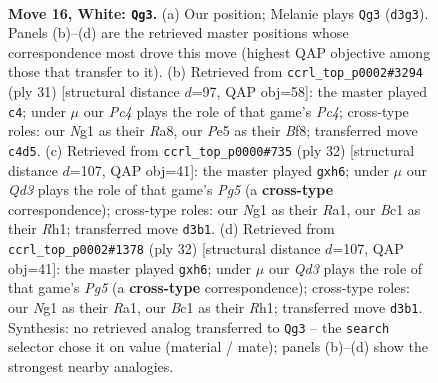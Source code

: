 \documentclass[11pt]{article}
\begin{document}
\begin{figure}[p]\centering
\begin{subfigure}{0.46\textwidth}\centering
\resizebox{\linewidth}{!}{%
\newchessgame
\chessboard[
  setfen={r3k1nr/1pq5/4p3/p1bpPp1p/b1Pn2p1/P2Q4/RP1N1PPP/2B1KBNR w Kkq - 5 16},
  showmover=false,
  pgfstyle=straightmove, color=movearrow, markmove={d3-g3}
]}
\caption{}
\end{subfigure}\hfill
\begin{subfigure}{0.46\textwidth}\centering
\resizebox{\linewidth}{!}{%
\newchessgame
\chessboard[
  setfen={r3kbnr/1p1n1bpp/p1q1P3/1Npp1p2/5B2/1QP2N1P/PP4P1/R3KB1R b KQkq - 0 16},
  showmover=false,
  pgfstyle=straightmove, color=movearrow, markmove={c5-c4}
]}
\caption{}
\end{subfigure}
\\[4pt]
\begin{subfigure}{0.46\textwidth}\centering
\resizebox{\linewidth}{!}{%
\newchessgame
\chessboard[
  setfen={r3k2r/1bq2p1p/3p1npb/p1n1p1P1/1pP1P3/4BP2/PP1QBN1P/R3K2R w KQkq - 0 17},
  showmover=false,
  pgfstyle=straightmove, color=movearrow, markmove={g5-h6}
]}
\caption{}
\end{subfigure}\hfill
\begin{subfigure}{0.46\textwidth}\centering
\resizebox{\linewidth}{!}{%
\newchessgame
\chessboard[
  setfen={r3k2r/1bq2p1p/3p1npb/p1n1p1P1/1pP1P3/4BP2/PP1QBN1P/R3K2R w KQkq - 0 17},
  showmover=false,
  pgfstyle=straightmove, color=movearrow, markmove={g5-h6}
]}
\caption{}
\end{subfigure}
\caption{\textbf{Move 16, White: \texttt{Qg3}.} (a) Our position; Melanie plays \texttt{Qg3} (\texttt{d3g3}). Panels (b)--(d) are the retrieved master positions whose correspondence most drove this move (highest QAP objective among those that transfer to it). (b) Retrieved from \texttt{ccrl\_top\_p0002\#3294} (ply 31) [structural distance $d$=97, QAP obj=58]: the master played \texttt{c4}; under $\mu$ our \emph{Pc4} plays the role of that game's \emph{Pc4}; cross-type roles: our \emph{N}g1 as their \emph{R}a8, our \emph{P}e5 as their \emph{B}f8; transferred move \texttt{c4d5}. (c) Retrieved from \texttt{ccrl\_top\_p0000\#735} (ply 32) [structural distance $d$=107, QAP obj=41]: the master played \texttt{gxh6}; under $\mu$ our \emph{Qd3} plays the role of that game's \emph{Pg5} (a \textbf{cross-type} correspondence); cross-type roles: our \emph{N}g1 as their \emph{R}a1, our \emph{B}c1 as their \emph{R}h1; transferred move \texttt{d3b1}. (d) Retrieved from \texttt{ccrl\_top\_p0002\#1378} (ply 32) [structural distance $d$=107, QAP obj=41]: the master played \texttt{gxh6}; under $\mu$ our \emph{Qd3} plays the role of that game's \emph{Pg5} (a \textbf{cross-type} correspondence); cross-type roles: our \emph{N}g1 as their \emph{R}a1, our \emph{B}c1 as their \emph{R}h1; transferred move \texttt{d3b1}. Synthesis: no retrieved analog transferred to \texttt{Qg3} -- the \texttt{search} selector chose it on value (material / mate); panels (b)--(d) show the strongest nearby analogies.}
\label{fig:thought-m30}
\end{figure}
\end{document}
